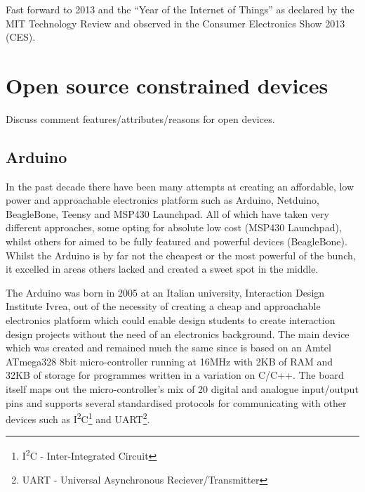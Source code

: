 \documentclass{l4proj}
\begin{document}
Fast forward to 2013 and the ``Year of the Internet of Things'' as declared by the MIT Technology Review\cite{2013IoT} and observed in the Consumer Electronics Show 2013 (CES).





\newpage
\section{Open source constrained devices} %
\label{sec:open_source_constrained_devices}
Discuss comment features/attributes/reasons for open devices.

\subsection{Arduino} %
\label{sub:arduino}
In the past decade there have been many attempts at creating an affordable, low power and approachable electronics platform such as Arduino, Netduino, BeagleBone, Teensy and MSP430 Launchpad. All of which have taken very different approaches, some opting for absolute low cost (MSP430 Launchpad), whilst others for aimed to be fully featured and powerful devices (BeagleBone). Whilst the Arduino is by far not the cheapest or the most powerful of the bunch, it excelled in areas others lacked and created a sweet spot in the middle.

The Arduino was born in 2005 at an Italian university, Interaction Design Institute Ivrea, out of the necessity of creating a cheap and approachable electronics platform which could enable design students to create interaction design projects without the need of an electronics background.
The main device which was created and remained much the same since is based on an Amtel ATmega328 8bit micro-controller running at 16MHz with 2KB of RAM and 32KB of storage for programmes written in a variation on C/C++. The board itself maps out the micro-controller's mix of 20 digital and analogue input/output pins and supports several standardised protocols for communicating with other devices such as I\textsuperscript{2}C\footnote{I\textsuperscript{2}C - Inter-Integrated Circuit} and UART\footnote{UART - Universal Asynchronous Reciever/Transmitter}. 
\end{document}
